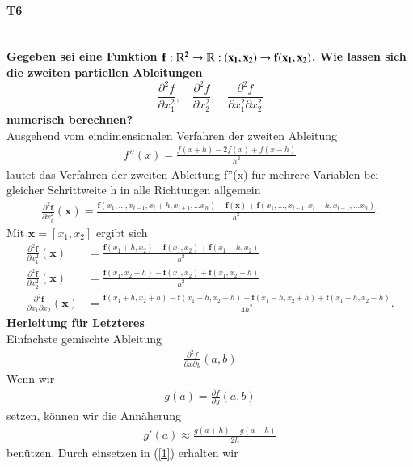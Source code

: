 \documentclass[10pt,a4paper]{article}
\begin{document}
	\paragraph{T6}\mbox{}\\
	\textbf{Gegeben sei eine Funktion $\mathbf{f:\varmathbb{R}^2\rightarrow \varmathbb{R}: (x_1,x_2)\rightarrow f(x_1,x_2)}$. Wie lassen sich die zweiten partiellen Ableitungen $$
		\frac{\partial^2 f}{\partial x_1^2}, \quad
		\frac{\partial^2 f}{\partial x_2^2}, \quad
		\frac{\partial^2 f}{\partial x_1^2 \partial x_2^2}
	$$ numerisch berechnen?} \\
	Ausgehend vom eindimensionalen Verfahren der zweiten Ableitung
	\begin{align*}
		f''(x)=\frac{f(x+h)-2f(x)+f(x-h)}{h^2}
	\end{align*}
	lautet das Verfahren der zweiten Ableitung f''(x) für mehrere Variablen bei gleicher Schrittweite h in alle Richtungen allgemein
	\begin{align*}
		\frac{\partial^2 \textbf{f}}{\partial x_i^2}(\textbf{x}) = \frac{\textbf{f}(x_1,\dots, x_{i-1},x_i+h,x_{i+1},\dots x_n)-\textbf{f}(\textbf{x})+\textbf{f}(x_1,\dots, x_{i-1},x_i-h,x_{i+1},\dots x_n)}{h^2}.
	\end{align*}
	Mit $\textbf{x} = [x_1, x_2]$ ergibt sich
	\begin{align*}
		\frac{\partial^2 \textbf{f}}{\partial x_1^2}(\textbf{x}) &= \frac{\textbf{f}(x_1+h,x_2)-\textbf{f}(x_1, x_2)+\textbf{f}(x_1-h,x_2)}{h^2}\\
		\frac{\partial^2 \textbf{f}}{\partial x_2^2}(\textbf{x}) &= \frac{\textbf{f}(x_1,x_2+h)-\textbf{f}(x_1, x_2)+\textbf{f}(x_1,x_2-h)}{h^2}\\
		\frac{\partial^2 \textbf{f}}{\partial x_1\partial x_2}(\textbf{x}) &=\frac{\textbf{f}(x_1+h,x_2+h)-\textbf{f}(x_1+h, x_2-h)-\textbf{f}(x_1-h, x_2+h)+\textbf{f}(x_1-h,x_2-h)}{4h^2}.
	\end{align*}
	\textbf{Herleitung für Letzteres} \\
	Einfachste gemischte Ableitung
	\begin{align*}
		\frac{\partial^2 f}{\partial x \partial y}(a,b)
	\end{align*}
	Wenn wir
	\begin{align}\label{1}
		g(a)=\frac{\partial f}{\partial y}(a,b)
	\end{align}
	setzen, können wir die Annäherung
	\begin{align*}
		g'(a)\approx\frac{g(a+h)-g(a-h)}{2h}
	\end{align*}
	benützen. Durch einsetzen in (\ref{1}) erhalten wir
\end{document}
